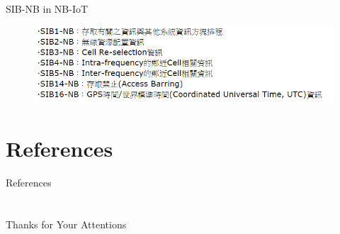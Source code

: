 \documentclass{beamer}
\begin{document}
\begin{frame} {SIB-NB in NB-IoT} 
    \begin{figure}[t]
    \centering
    \includegraphics[width=1\textwidth]{figures/sibnb.png}
    \end{figure}
\end{frame}
\section{References}
\calcreferencespagetotal %
\begin{frame}[allowframebreaks]{References}
    \fontsize{9pt}{13}\selectfont
    
    
\end{frame}

\section{}

\begin{frame}
    \centering
    \Large{Thanks for Your Attentions}
\end{frame}
\end{document}
